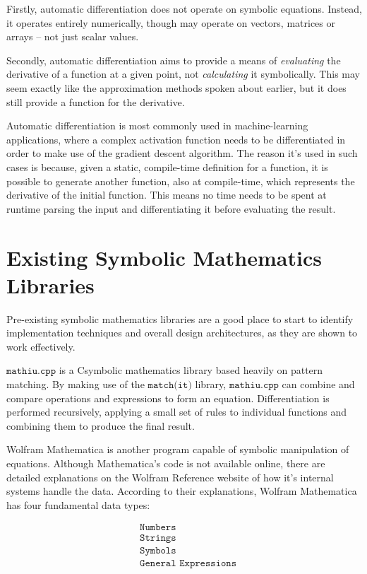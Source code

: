 \documentclass[12pt]{article}
\def\CC{{C\nolinebreak[4]\hspace{-.05em}\raisebox{.4ex}{\tiny\bf ++ }}}
\begin{document}
Firstly, automatic differentiation does not operate on symbolic equations. Instead, it operates entirely numerically, though may operate on vectors, matrices or arrays -- not just scalar values.

Secondly, automatic differentiation aims to provide a means of \textit{evaluating} the derivative of a function at a given point, not \textit{calculating} it symbolically. This may seem exactly like the approximation methods spoken about earlier, but it does still provide a function for the derivative.

Automatic differentiation is most commonly used in machine-learning applications, where a complex activation function needs to be differentiated in order to make use of the gradient descent algorithm. The reason it's used in such cases is because, given a static, compile-time definition for a function, it is possible to generate another function, also at compile-time, which represents the derivative of the initial function. This means no time needs to be spent at runtime parsing the input and differentiating it before evaluating the result.

\pagebreak
\section{Existing Symbolic Mathematics Libraries}

Pre-existing symbolic mathematics libraries are a good place to start to identify implementation techniques and overall design architectures, as they are shown to work effectively.

$\texttt{mathiu.cpp}$\cite{mathiucpp} is a \CC symbolic mathematics library based heavily on pattern matching. By making use of the $\texttt{match(it)}$ library, $\texttt{mathiu.cpp}$ can combine and compare operations and expressions to form an equation. Differentiation is performed recursively, applying a small set of rules to individual functions and combining them to produce the final result.

Wolfram Mathematica is another program capable of symbolic manipulation of equations. Although Mathematica's code is not available online, there are detailed explanations on the Wolfram Reference website \cite{mathematicainternals} of how it's internal systems handle the data. According to their explanations, Wolfram Mathematica has four fundamental data types:

\begin{align*}
&\texttt{Numbers}
\\
&\texttt{Strings}
\\
&\texttt{Symbols}
\\
&\texttt{General Expressions}
\end{align*}
\end{document}
